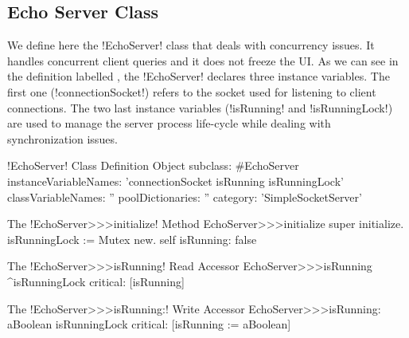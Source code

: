 \documentclass[a4paper,10pt,twoside]{book}
\begin{document}
%

\subsection{Echo Server Class}
We define here the \ct!EchoServer! class that deals with concurrency issues.
It handles concurrent client queries and it does not freeze the UI.
As we can see in the definition labelled , the \ct!EchoServer! declares three instance variables.
The first one (\ct!connectionSocket!) refers to the socket used for listening to client connections.
The two last instance variables (\ct!isRunning! and \ct!isRunningLock!) are used to manage the server process life-cycle while dealing with synchronization issues.
 
\begin{classdef}[echoServerClassDef]{\ct!EchoServer! Class Definition}
Object subclass: #EchoServer
	instanceVariableNames: 'connectionSocket isRunning isRunningLock'
	classVariableNames: ''
	poolDictionaries: ''
	category: 'SimpleSocketServer'
\end{classdef}

\begin{method}{The \ct!EchoServer>>>initialize! Method}
EchoServer>>>initialize 
	super initialize.
	isRunningLock := Mutex new.
	self isRunning: false
\end{method}

\begin{method}{The \ct!EchoServer>>>isRunning! Read Accessor}
EchoServer>>>isRunning
	^isRunningLock critical: [isRunning]
\end{method}

\begin{method}{The \ct!EchoServer>>>isRunning:! Write Accessor}
EchoServer>>>isRunning: aBoolean
	isRunningLock critical: [isRunning := aBoolean]
\end{method}
\end{document}
